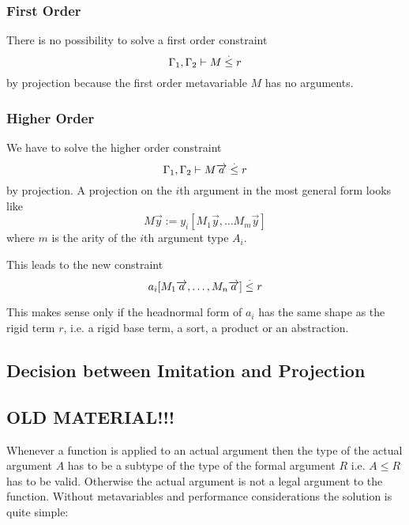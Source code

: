 \subsubsection{First Order}

There is no possibility to solve a first order constraint
$$
    \Gamma_1, \Gamma_2 \vdash M \stackrel . \le r
$$
by projection because the first order metavariable $M$ has no arguments.




\subsubsection{Higher Order}

We have to solve the higher order constraint
$$
    \Gamma_1, \Gamma_2
    \vdash
    M {\overrightarrow {a}}   \stackrel . \le  r
$$
by projection. A projection on the $i$th argument in the most general form looks
like
$$
    M \vec y := y_i [M_1 \vec y, \ldots M_m \vec y]
$$
where $m$ is the arity of the $i$th argument type $A_i$.

This leads to the new constraint
$$
    a_i [M_1 {\overrightarrow {a}}, \ldots, M_n {\overrightarrow {a}}] \stackrel . \le r
$$

This makes sense only if the headnormal form of $a_i$ has the same shape as the
rigid term $r$, i.e. a rigid base term, a sort, a product or an abstraction.




\subsection{Decision between Imitation and Projection}









\subsection{OLD MATERIAL!!!}

Whenever a function is applied to an actual argument then the type of the actual
argument $A$ has to be a subtype of the type of the formal argument $R$ i.e. $A
\le R$ has to be valid. Otherwise the actual argument is not a legal argument to
the function. Without metavariables and performance considerations the solution
is quite simple:

